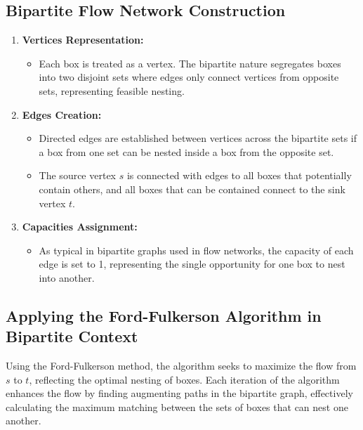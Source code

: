\documentclass{article}
\begin{document}
    \subsection{Bipartite Flow Network Construction}
        \begin{enumerate}
            \item \textbf{Vertices Representation:}
            \begin{itemize}
                \item Each box is treated as a vertex. The bipartite nature segregates boxes into two disjoint sets where edges only connect vertices from opposite sets, representing feasible nesting.
            \end{itemize}
        
            \item \textbf{Edges Creation:}
            \begin{itemize}
                \item Directed edges are established between vertices across the bipartite sets if a box from one set can be nested inside a box from the opposite set.
                \item The source vertex \(s\) is connected with edges to all boxes that potentially contain others, and all boxes that can be contained connect to the sink vertex \(t\).
            \end{itemize}
        
            \item \textbf{Capacities Assignment:}
            \begin{itemize}
                \item As typical in bipartite graphs used in flow networks, the capacity of each edge is set to 1, representing the single opportunity for one box to nest into another.
            \end{itemize}
        \end{enumerate}

    \subsection{Applying the Ford-Fulkerson Algorithm in Bipartite Context}
        Using the Ford-Fulkerson method, the algorithm seeks to maximize the flow from \(s\) to \(t\), reflecting the optimal nesting of boxes. Each iteration of the algorithm enhances the flow by finding augmenting paths in the bipartite graph, effectively calculating the maximum matching between the sets of boxes that can nest one another.
        
\end{document}
